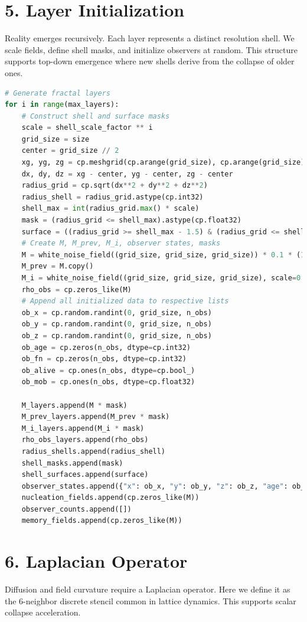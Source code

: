 \section*{5. Layer Initialization}
Reality emerges recursively. Each layer represents a distinct resolution shell. We scale fields, define shell masks, and initialize observers at random. This structure supports top-down emergence where new shells derive from the collapse of older ones.
\begin{lstlisting}[language=Python]
# Generate fractal layers
for i in range(max_layers):
    # Construct shell and surface masks
    scale = shell_scale_factor ** i
    grid_size = size
    center = grid_size // 2
    xg, yg, zg = cp.meshgrid(cp.arange(grid_size), cp.arange(grid_size), cp.arange(grid_size), indexing='ij')
    dx, dy, dz = xg - center, yg - center, zg - center
    radius_grid = cp.sqrt(dx**2 + dy**2 + dz**2)
    radius_shell = radius_grid.astype(cp.int32)
    shell_max = int(radius_grid.max() * scale)
    mask = (radius_grid <= shell_max).astype(cp.float32)
    surface = ((radius_grid >= shell_max - 1.5) & (radius_grid <= shell_max)).astype(cp.float32)
    # Create M, M_prev, M_i, observer states, masks
    M = white_noise_field((grid_size, grid_size, grid_size)) * 0.1 * (1.0 / (1 + i))
    M_prev = M.copy()
    M_i = white_noise_field((grid_size, grid_size, grid_size), scale=0.001)
    rho_obs = cp.zeros_like(M)
    # Append all initialized data to respective lists
    ob_x = cp.random.randint(0, grid_size, n_obs)
    ob_y = cp.random.randint(0, grid_size, n_obs)
    ob_z = cp.random.randint(0, grid_size, n_obs)
    ob_age = cp.zeros(n_obs, dtype=cp.int32)
    ob_fn = cp.zeros(n_obs, dtype=cp.int32)
    ob_alive = cp.ones(n_obs, dtype=cp.bool_)
    ob_mob = cp.ones(n_obs, dtype=cp.float32)

    M_layers.append(M * mask)
    M_prev_layers.append(M_prev * mask)
    M_i_layers.append(M_i * mask)
    rho_obs_layers.append(rho_obs)
    radius_shells.append(radius_shell)
    shell_masks.append(mask)
    shell_surfaces.append(surface)
    observer_states.append({"x": ob_x, "y": ob_y, "z": ob_z, "age": ob_age, "fn": ob_fn, "alive": ob_alive, "mobility": ob_mob})
    nucleation_fields.append(cp.zeros_like(M))
    observer_counts.append([])
    memory_fields.append(cp.zeros_like(M))
\end{lstlisting}

\section*{6. Laplacian Operator}
Diffusion and field curvature require a Laplacian operator. Here we define it as the 6-neighbor discrete stencil common in lattice dynamics. This supports scalar collapse acceleration.

